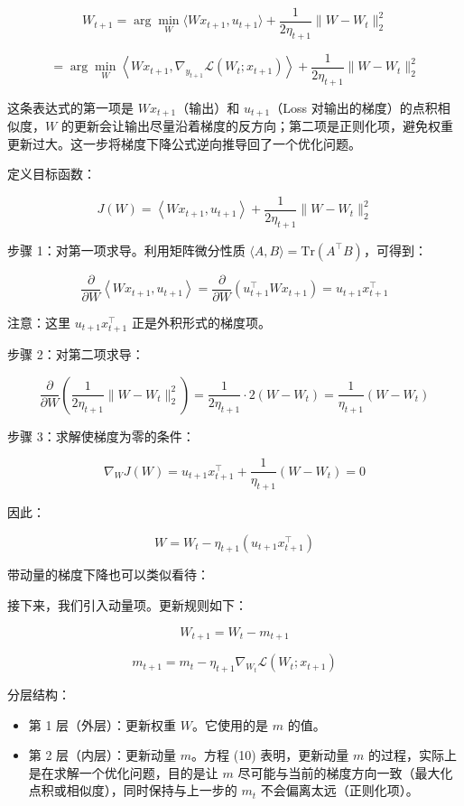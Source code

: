 \[
W_{t+1}=\arg\min_W \langle Wx_{t+1},u_{t+1}\rangle+\frac{1}{2\eta_{t+1}}\lVert W-W_t\rVert_2^2
\tag{5}
\]

\[
=\arg\min_W\left\langle Wx_{t+1},\nabla_{y_{t+1}}\mathcal{L}(W_t;x_{t+1})\right\rangle+\frac{1}{2\eta_{t+1}}\lVert W-W_t\rVert_2^2
\tag{6}
\]

这条表达式的第一项是 \(Wx_{t+1}\)（输出）和 \(u_{t+1}\)（Loss 对输出的梯度）的点积相似度，\(W\) 的更新会让输出尽量沿着梯度的反方向；第二项是正则化项，避免权重更新过大。这一步将梯度下降公式逆向推导回了一个优化问题。

定义目标函数：

\[
J(W)=\left\langle Wx_{t+1},u_{t+1}\right\rangle+\frac{1}{2\eta_{t+1}}\lVert W-W_t\rVert_2^2
\]

步骤 1：对第一项求导。利用矩阵微分性质 \(\langle A,B\rangle=\mathrm{Tr}(A^\top B)\)，可得到：

\[
\frac{\partial}{\partial W}\left\langle Wx_{t+1},u_{t+1}\right\rangle
=\frac{\partial}{\partial W}\left(u_{t+1}^{\top}Wx_{t+1}\right)
=u_{t+1}x_{t+1}^{\top}
\]

注意：这里 \(u_{t+1}x_{t+1}^{\top}\) 正是外积形式的梯度项。

步骤 2：对第二项求导：

\[
\frac{\partial}{\partial W}\left(\frac{1}{2\eta_{t+1}}\lVert W-W_t\rVert_2^2\right)
=\frac{1}{2\eta_{t+1}}\cdot 2(W-W_t)
=\frac{1}{\eta_{t+1}}(W-W_t)
\]

步骤 3：求解使梯度为零的条件：

\[
\nabla_W J(W)=u_{t+1}x_{t+1}^{\top}+\frac{1}{\eta_{t+1}}(W-W_t)=0
\]

因此：

\[
W=W_t-\eta_{t+1}(u_{t+1}x_{t+1}^{\top})
\]

带动量的梯度下降也可以类似看待：

接下来，我们引入动量项。更新规则如下：

\[
W_{t+1}=W_t-m_{t+1}
\tag{7}
\]

\[
m_{t+1}=m_t-\eta_{t+1}\nabla_{W_t}\mathcal{L}(W_t;x_{t+1})
\tag{8}
\]

分层结构：

\begin{itemize}
\tightlist
\item
  第 1 层（外层）：更新权重 \(W\)。它使用的是 \(m\) 的值。
\item
  第 2 层（内层）：更新动量 \(m\)。方程 (10) 表明，更新动量 \(m\) 的过程，实际上是在求解一个优化问题，目的是让 \(m\) 尽可能与当前的梯度方向一致（最大化点积或相似度），同时保持与上一步的 \(m_t\) 不会偏离太远（正则化项）。
\end{itemize}

